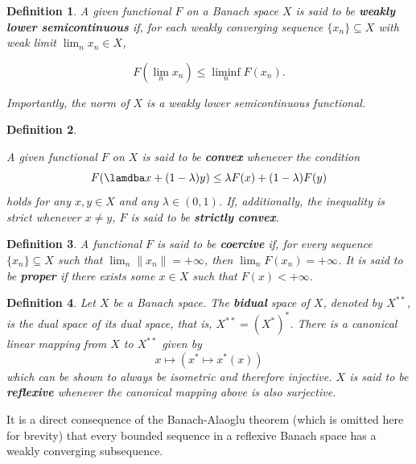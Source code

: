 \documentclass[twocolumn,twoside,a4paper,10pt]{IEEEtran}
\newtheorem{definition}{Definition}
\begin{document}
\begin{definition}
  A given functional \(F\) on a Banach space \(X\) is said to be \textbf{weakly lower semicontinuous} if, for each weakly converging sequence \(\{x_n\}\subseteq X\) with weak limit \(\lim_nx_n\in X\),

  \[
    F(\lim_nx_n)\leq \liminf_n F(x_n)
  .\]

  Importantly, the norm of \(X\) is a weakly lower semicontinuous functional.
\end{definition}

\begin{definition}\label{def:convexity}

  A given functional \(F\) on \(X\) is said to be \textbf{convex} whenever the condition
  \[
    F(\lamdba x + (1-\lambda)y) \leq \lambda F(x) + (1-\lambda) F(y)
  \]
  holds for any \(x, y\in X\) and any \(\lambda\in(0, 1)\). If, additionally, the inequality is strict whenever \(x\neq y\), \(F\) is said to be \textbf{strictly convex}.
\end{definition}

\begin{definition}
  A functional \(F\) is said to be \textbf{coercive} if, for every sequence \(\{x_n\}\subseteq X\) such that \(\lim_n \|x_n\|=+\infty\), then \(\lim_nF(x_n)=+\infty\).
It is said to be \textbf{proper} if there exists some \(x\in X\) such that \(F(x) < +\infty\).
\end{definition}

\begin{definition}
  Let \(X\) be a Banach space. The \textbf{bidual} space of \(X\), denoted by \(X^{**}\), is the dual space of its dual space, that is, \(X^{**}=(X^*)^*\). There is a canonical linear mapping from \(X\) to \(X^{**}\) given by
  \[
    x\mapsto(x^*\mapsto x^*(x))
  \]
  which can be shown to always be isometric and therefore injective. \(X\) is said to be \textbf{reflexive} whenever the canonical mapping above is also surjective.
\end{definition}

It is a direct consequence of the Banach-Alaoglu theorem (which is omitted here for brevity) that every bounded sequence in a reflexive Banach space has a weakly converging subsequence.
\end{document}
